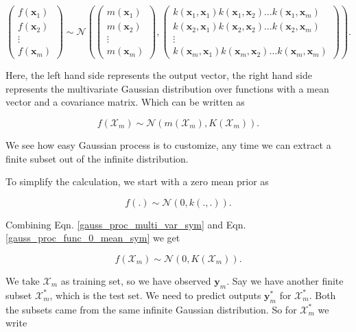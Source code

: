 \documentclass[english]{tktltiki}
\begin{document}
$$
\begin{pmatrix}
f(\mathbf{x}_1) \\
f(\mathbf{x}_2) \\
\vdots \\
f(\mathbf{x}_m)
\end{pmatrix}
\sim \mathcal{N} \left(%
\begin{pmatrix}
m(\mathbf{x}_1) \\
m(\mathbf{x}_2) \\
\vdots \\
m(\mathbf{x}_m)
\end{pmatrix}
,%
\begin{pmatrix}
k(\mathbf{x}_1, \mathbf{x}_1) k(\mathbf{x}_1, \mathbf{x}_2) \hdots k(\mathbf{x}_1, \mathbf{x}_m) \\
k(\mathbf{x}_2, \mathbf{x}_1) k(\mathbf{x}_2, \mathbf{x}_2) \hdots k(\mathbf{x}_2, \mathbf{x}_m) \\
\vdots \\
k(\mathbf{x}_m, \mathbf{x}_1) k(\mathbf{x}_m, \mathbf{x}_2) \hdots k(\mathbf{x}_m, \mathbf{x}_m) 
\end{pmatrix}\right).
$$

Here, the left hand side represents the output vector, the right hand side represents the multivariate Gaussian distribution over functions with a mean vector and a covariance matrix. Which can be written as

\begin{equation}
f(\mathcal{X}_m) \sim \mathcal{N} (m(\mathcal{X}_m), K(\mathcal{X}_m)).
\label{gauss_proc_multi_var_sym}
\end{equation}

We see how easy Gaussian process is to customize, any time we can extract a finite subset out of the infinite distribution.

To simplify the calculation, we start with a zero mean prior as

\begin{equation}
f(.) \sim \mathcal{N} (0, k(.,.))
\label{gauss_proc_func_0_mean_sym}.
\end{equation}

Combining Eqn. \ref{gauss_proc_multi_var_sym} and Eqn. \ref{gauss_proc_func_0_mean_sym} we get

\begin{equation}
f(\mathcal{X}_m) \sim \mathcal{N} (0, K(\mathcal{X}_m))
\label{eq:gp_training}.
\end{equation}

We take $\mathcal{X}_m$ as training set, so we have observed $\mathbf{y}_m$. Say we have another finite subset $\mathcal{X}_m^*$, which is the test set. We need to predict outputs $\mathbf{y}_m^*$ for $\mathcal{X}_m^*$. Both the subsets came from the same infinite Gaussian distribution. So for $\mathcal{X}_m^*$ we write
\end{document}
